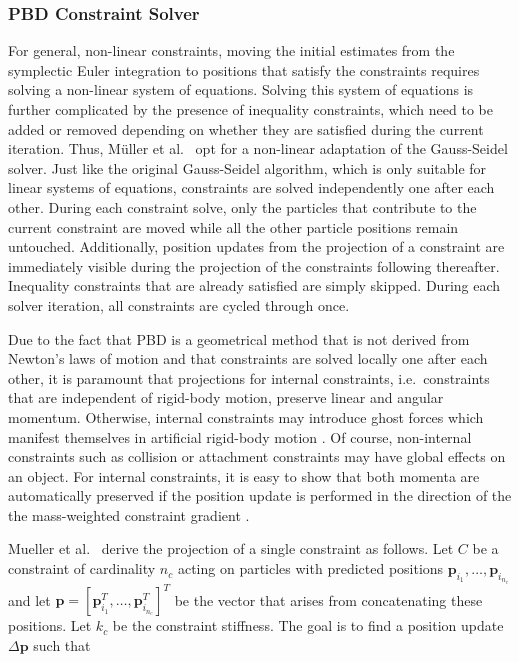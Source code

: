 \subsubsection{PBD Constraint Solver}\label{sss:pbd-constraint-solver}
For general, non-linear constraints, moving the initial estimates from the symplectic Euler integration to positions that satisfy the constraints
requires solving a non-linear system of equations. Solving this system of equations is further complicated by the presence of inequality constraints, which
need to be added or removed depending on whether they are satisfied during the current iteration. Thus, Müller et al.\ \cite{mueller2006} opt for a 
non-linear adaptation of the Gauss-Seidel solver. Just like the original Gauss-Seidel algorithm, which is only suitable for linear systems of equations, 
constraints are solved independently one after each other. During each constraint solve, only the particles that contribute to the current constraint are
moved while all the other particle positions remain untouched. Additionally, position updates from the projection of a constraint are immediately 
visible during the projection of the constraints following thereafter. Inequality constraints that are already satisfied are simply skipped. 
During each solver iteration, all constraints are cycled through once.

Due to the fact that PBD is a geometrical method that is not derived from Newton's laws of motion and that constraints are solved locally one after each 
other, it is paramount that projections for internal constraints, i.e.\ constraints that are independent of rigid-body motion, preserve linear and 
angular momentum. Otherwise, internal constraints may introduce 
ghost forces which manifest themselves in artificial rigid-body motion \cite{mueller2006}. Of course, non-internal constraints such as collision or attachment constraints
may have global effects on an object. For internal constraints, it is easy to show that both momenta are automatically preserved if the position update 
is performed in the direction of the the mass-weighted constraint gradient \cite{mueller2006}.

Mueller et al.\ \cite{mueller2006} derive the projection of a single constraint as follows. Let $C$ be a constraint of cardinality $n_c$ acting on 
particles with predicted positions $\bm{p}_{i_1}, \ldots, \bm{p}_{i_{n_c}}$ and let $\bm{p} = [\bm{p}^T_{i_1}, \ldots, \bm{p}^T_{i_{n_c}}]^T$ be the
vector that arises from concatenating these positions. Let $k_c$ be the constraint stiffness. The goal is to find a position update $\Delta \bm{p}$ 
such that 

